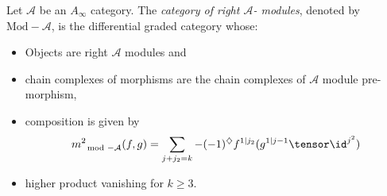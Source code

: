 
 
 
Let $\mathcal A$ be  an \emph{$A_\infty$} category. The \emph{category of right $\mathcal A$- modules}, denoted by $\text{Mod}-\mathcal A$, is the differential graded category whose: 
\begin{itemize}
    \item Objects are right $\mathcal A$ modules and
    \item chain complexes of morphisms are the chain complexes of $\mathcal A$ module pre-morphism,
    \item composition is given by 
    \[m^2_{\mod-\mathcal A}(f, g)=\sum_{j+j_2=k}-(-1)^\diamondsuit f^{1|j_2}(g^{1|j-1}\tensor \id^{j^2})\]
    \item higher product vanishing for $k\geq 3.$
\end{itemize}
 
